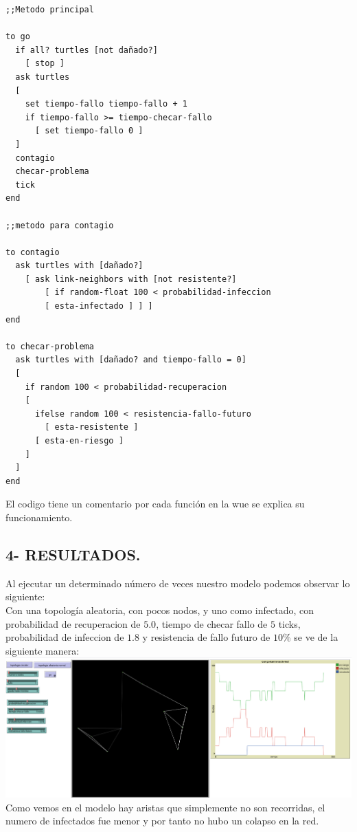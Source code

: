\documentclass[12pt]{article}
\begin{document}
\begin{verbatim}
;;Metodo principal

to go
  if all? turtles [not dañado?]
    [ stop ]
  ask turtles
  [
    set tiempo-fallo tiempo-fallo + 1
    if tiempo-fallo >= tiempo-checar-fallo
      [ set tiempo-fallo 0 ]
  ]
  contagio
  checar-problema
  tick
end

;;metodo para contagio

to contagio
  ask turtles with [dañado?]
    [ ask link-neighbors with [not resistente?]
        [ if random-float 100 < probabilidad-infeccion
        [ esta-infectado ] ] ]
end

to checar-problema
  ask turtles with [dañado? and tiempo-fallo = 0]
  [
    if random 100 < probabilidad-recuperacion
    [
      ifelse random 100 < resistencia-fallo-futuro
        [ esta-resistente ]
      [ esta-en-riesgo ]
    ]
  ]
end
\end{verbatim}

El codigo tiene un comentario por cada función en la wue se explica su funcionamiento.


{\color{blue} \subsection*{4- RESULTADOS.}}
\vspace{1em}

Al ejecutar un determinado número de veces nuestro modelo podemos observar lo siguiente:\\


Con una topología aleatoria, con pocos nodos, y uno como infectado, con probabilidad de recuperacion de $5.0$, tiempo de checar fallo de $5$ ticks, probabilidad de infeccion de $1.8$ y resistencia de fallo futuro de $10$\% se ve de la siguiente manera:\\

\textbf{\includegraphics[scale = 0.28]{images/image1.png}} Como vemos en el modelo hay aristas que simplemente no son recorridas, el numero de infectados fue menor y por tanto no hubo un colapso en la red. \\
\end{document}
